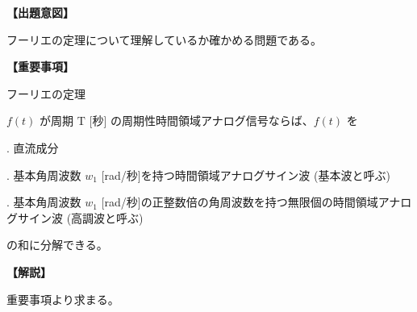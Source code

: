 \noindent \textbf{【出題意図】}

\noindent フーリエの定理について理解しているか確かめる問題である。

\vspace{1em}
\noindent \textbf{【重要事項】}

\noindent フーリエの定理

\smallskip
$f(t)$ が周期 $\textrm{T}$ [秒] の周期性時間領域アナログ信号ならば、$f(t)$ を

. 直流成分

. 基本角周波数 $w_1$ [rad/秒]を持つ時間領域アナログサイン波 (基本波と呼ぶ)

. 基本角周波数 $w_1$ [rad/秒]の正整数倍の角周波数を持つ無限個の時間領域アナログサイン波 (高調波と呼ぶ)

\smallskip
の和に分解できる。


\vspace{1em}
\noindent \textbf{【解説】}

\noindent 重要事項より求まる。
